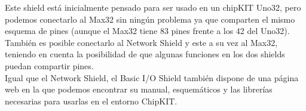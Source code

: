Este shield está inicialmente pensado para ser usado en un chipKIT Uno32, pero podemos conectarlo al Max32 sin ningún problema ya que comparten el mismo esquema de pines (aunque el Max32 tiene 83 pines frente a los 42 del Uno32). También es posible conectarlo al Network Shield y este a su vez al Max32, teniendo en cuenta la posibilidad de que algunas funciones en los dos shields puedan compartir pines.\\

Igual que el Network Shield, el Basic I/O Shield también dispone de una página web\cite{website:io_shield} en la que podemos encontrar su manual, esquemáticos y las librerías necesarias para usarlas en el entorno ChipKIT.